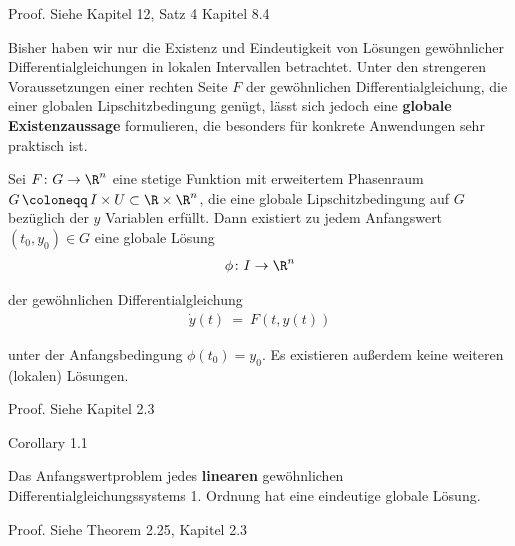 \documentclass[letterpaper,10pt,english]{jupyterBook}
\begin{document}
\begin{emphBox}{}{}
\par
Proof. Siehe Kapitel 12, Satz 4 Kapitel 8.4 \cite{For17}
\end{emphBox}

\par
Bisher haben wir nur die Existenz und Eindeutigkeit von Lösungen gewöhnlicher Differentialgleichungen in lokalen Intervallen betrachtet.
Unter den strengeren Voraussetzungen einer rechten Seite \(F\) der gewöhnlichen Differentialgleichung, die einer globalen Lipschitzbedingung genügt, lässt sich jedoch eine \textbf{globale Existenzaussage} formulieren, die besonders für konkrete Anwendungen sehr praktisch ist.
\label{ode/repetition:satz:picardlindeloef}
\begin{theorem}{}{}



\par
Sei \(F\colon G\to\R^n\) eine stetige Funktion mit erweitertem Phasenraum \(G \, \coloneqq \, I \times U \subset \R\times\R^n\), die eine globale Lipschitzbedingung auf \(G\) bezüglich der \(y\) Variablen erfüllt.
Dann existiert zu jedem Anfangswert \((t_0,y_0) \in G\) eine globale Lösung
\begin{align*}
\phi \colon I \to \R^n
\end{align*}
\par
der gewöhnlichen Differentialgleichung
\begin{align*}
\dot{y}(t) \ = \ F(t,y(t))
\end{align*}
\par
unter der Anfangsbedingung \(\phi(t_0)=y_0\).
Es existieren außerdem keine weiteren (lokalen) Lösungen.
\end{theorem}

\begin{emphBox}{}{}
\par
Proof. Siehe Kapitel 2.3 \cite{Kna13}
\end{emphBox}
\label{ode/repetition:corollary-11}
\begin{emphBox}{}{}{Corollary 1.1}



\par
Das Anfangswertproblem jedes \textbf{linearen} gewöhnlichen Differentialgleichungssystems 1. Ordnung hat eine eindeutige globale Lösung.
\end{emphBox}

\begin{emphBox}{}{}
\par
Proof. Siehe Theorem 2.25, Kapitel 2.3 \cite{Kna13}
\end{emphBox}
\end{document}
